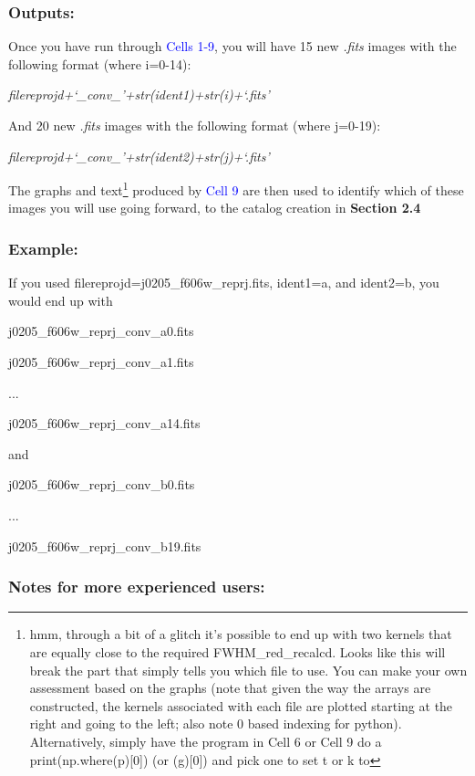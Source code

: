 \documentclass[a4paper,10pt]{article}
\begin{document}
\begin{itemize}
\end{itemize}

\subsubsection{Outputs:}

Once you have run through \textcolor{blue}{Cells 1-9}, you will have 15 new \textit{.fits} images with the following format (where i=0-14):

\centerline{\textit{filereprojd+`\_conv\_'+str(ident1)+str(i)+`.fits'}}

\noindent And 20 new \textit{.fits} images with the following format (where j=0-19):

\centerline{\textit{filereprojd+`\_conv\_'+str(ident2)+str(j)+`.fits'}}

\noindent The graphs and text\footnote{hmm, through a bit of a glitch it's possible to end up with two kernels that are equally close to the required FWHM\_red\_recalcd. Looks like this will break the part that simply tells you which file to use. You can make your own assessment based on the graphs (note that given the way the arrays are constructed, the kernels associated with each file are plotted starting at the right and going to the left; also note 0 based indexing for python). Alternatively, simply have the program in Cell 6 or Cell 9 do a print(np.where(p)[0]) (or (g)[0]) and pick one to set t or k to} produced by \textcolor{blue}{Cell 9} are then used to identify which of these images you will use going forward, to the catalog creation in \textbf{Section 2.4} 

\subsubsection*{Example:}

If you used filereprojd=j0205\_f606w\_reprj.fits, ident1=a, and ident2=b, you would end up with

\centerline{j0205\_f606w\_reprj\_conv\_a0.fits}
\centerline{j0205\_f606w\_reprj\_conv\_a1.fits}
\centerline{...}
\centerline{j0205\_f606w\_reprj\_conv\_a14.fits}
and \\
\centerline{j0205\_f606w\_reprj\_conv\_b0.fits}
\centerline{...}
\centerline{j0205\_f606w\_reprj\_conv\_b19.fits}



\subsubsection*{Notes for more experienced users:}
\end{document}
